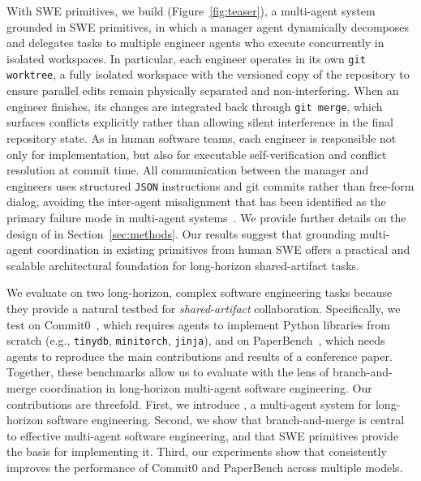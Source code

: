 
With SWE primitives, we build \ourmethod (Figure~\ref{fig:teaser}), a multi-agent system grounded in SWE primitives, in which a manager agent dynamically decomposes and delegates tasks to multiple engineer agents who execute concurrently in isolated workspaces.
In particular, each engineer operates in its own \texttt{git worktree}, a fully isolated workspace with the versioned copy of the repository to ensure parallel edits remain physically separated and non-interfering. When an engineer finishes, its changes are integrated back through \texttt{git merge}, which surfaces conflicts explicitly rather than allowing silent interference in the final repository state. As in human software teams, each engineer is responsible not only for implementation, but also for executable self-verification and conflict resolution at commit time. All communication between the manager and engineers uses structured \texttt{JSON} instructions and git commits rather than free-form dialog, avoiding the inter-agent misalignment that has been identified as the primary failure mode in multi-agent systems~\citep{cemri2025multi}. We provide further details on the design of \ourmethod in Section~\ref{sec:methods}. Our results suggest that grounding multi-agent coordination in existing primitives from human SWE offers a practical and scalable architectural foundation for long-horizon shared-artifact tasks.

We evaluate \ourmethod on two long-horizon, complex software engineering tasks because they provide a natural testbed for \emph{shared-artifact} collaboration. Specifically, we test \ourmethod on Commit0~\citep{zhao2024commit0}, which requires agents to implement Python libraries from scratch (e.g., \texttt{tinydb}, \texttt{minitorch}, \texttt{jinja}), and on PaperBench~\citep{starace2025paperbench}, which needs agents to reproduce the main contributions and results of a conference paper. Together, these benchmarks allow us to evaluate \ourmethod with the lens of branch-and-merge coordination in long-horizon multi-agent software engineering. Our contributions are threefold. First, we introduce \ourmethod, a multi-agent system for long-horizon software engineering. Second, we show that branch-and-merge is central to effective multi-agent software engineering, and that SWE primitives provide the basis for implementing it. Third, our experiments show that \ourmethod consistently improves the performance of Commit0 and PaperBench across multiple models.


